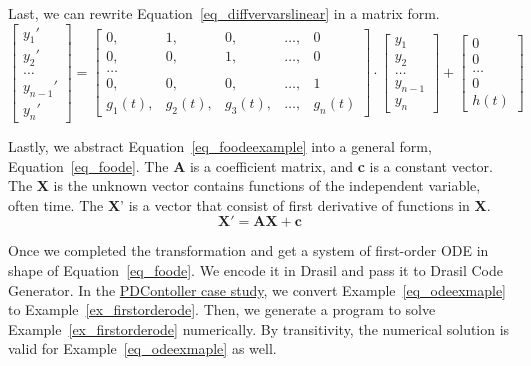 Last, we can rewrite Equation~\ref{eq_diffvervarslinear} in a matrix form.
\begin{equation} \label{eq_foodeexample}
	\begin{bmatrix}
		y_{1}' \\
    y_{2}' \\
    \dots  \\
    y_{n-1}' \\
    y_{n}'
	\end{bmatrix}
    = 
  \begin{bmatrix}
		0, & 1, & 0, & \dots, & 0 \\
    0, & 0, & 1, & \dots, & 0 \\
    \dots \\
    0, & 0, & 0, & \dots, & 1 \\
    g_{1}(t), & g_{2}(t), & g_{3}(t), & \dots, & g_{n}(t)
	\end{bmatrix}
    \cdot
  \begin{bmatrix}
		y_{1} \\
    y_{2} \\
    \dots  \\
    y_{n-1} \\
    y_{n}
	\end{bmatrix}
    + 
  \begin{bmatrix}
    0 \\
    0 \\
    \dots  \\
    0 \\
    h(t)
	\end{bmatrix}
\end{equation}

Lastly, we abstract Equation~\ref{eq_foodeexample} into a general form, Equation~\ref{eq_foode}. The \textbf{A} is a coefficient matrix, and \textbf{c} is a constant vector. The \textbf{X} is the unknown vector contains functions of the independent variable, often time. The \textbf{X}' is a vector that consist of first derivative of functions in \textbf{X}.
\begin{equation} \label{eq_foode}
    \boldsymbol{X}' = \boldsymbol{AX} + \boldsymbol{c}
\end{equation}

Once we completed the transformation and get a system of first-order ODE in shape of Equation~\ref{eq_foode}. We encode it in Drasil and pass it to Drasil Code Generator. In the \href{https://jacquescarette.github.io/Drasil/examples/pdcontroller/SRS/srs/PDController_SRS.html#Sec:IMs}{PDContoller case study}, we convert Example~\ref{eq_odeexmaple} to Example~\ref{ex_firstorderode}. Then, we generate a program to solve Example~\ref{ex_firstorderode} numerically. By transitivity, the numerical solution is valid for Example~\ref{eq_odeexmaple} as well.

